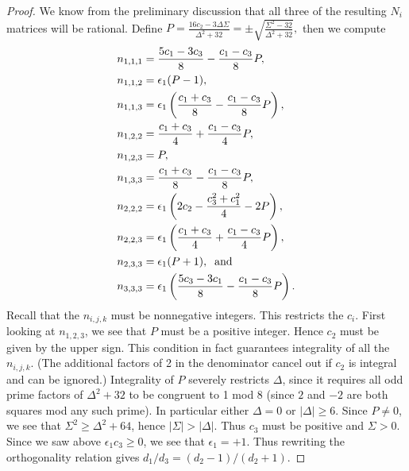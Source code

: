 \documentclass[12pt,psamsfonts]{amsart}
\newcommand{\e}{{\epsilon}}
\numberwithin{equation}{section}
\theoremstyle{definition}
\begin{document}
\begin{proof}
We know from the preliminary discussion that all three of the
resulting $N_i$ matrices will be rational. Define
$P=\frac{16c_2-3\Delta\Sigma}{\Delta^2+32}=
\pm {\sqrt {\frac{\Sigma^2-32}{\Delta^2+32}}},$ then we compute
\begin{equation*}\begin{split}
n_{1,1,1} & =\frac{5c_1-3c_3}{8} - \frac{c_1-c_3}{8} P,\\
n_{1,1,2} & = \e_1 (P-1),\\
n_{1,1,3} & = \e_1 \left(\frac{c_1+c_3}{8}-\frac{c_1-c_3}{8}P\right),\\
n_{1,2,2} & = \frac{c_1+c_3}{4} + \frac{c_1-c_3}{4}P,\\
n_{1,2,3} & = P,\\
n_{1,3,3} & = \frac{c_1+c_3}{8}-\frac{c_1-c_3}{8}P,\\
n_{2,2,2} & = \e_1\left(2c_2-\frac{c_3^2+c_1^2}{4}-2P\right),\\
n_{2,2,3} & = \e_1\left(\frac{c_1+c_3}{4} + \frac{c_1-c_3}{4}P\right),\\
n_{2,3,3} & = \e_1 (P+1),\;\; {\rm and}\\
n_{3,3,3} & = \e_1\left(
\frac{5c_3-3c_1}{8}-\frac{c_1-c_3}{8}P\right).
\end{split}\end{equation*}
Recall that the $n_{i,j,k}$ must be nonnegative integers. This
restricts the $c_i$. First looking at $n_{1,2,3}$, we see that $P$
must be a positive integer. Hence $c_2$ must be given by the upper
sign. This condition in fact guarantees integrality of all the
$n_{i,j,k}$. (The additional factors of 2 in the denominator
cancel out if $c_2$ is integral and can be ignored.) Integrality
of $P$ severely restricts $\Delta$, since it requires all odd
prime factors of $\Delta^2+32$ to be congruent to 1 mod 8 (since
$2$ and $-2$ are both squares mod any such prime). In particular
either $\Delta=0$ or $\vert \Delta\vert \ge 6$. Since $P\ne 0$, we
see that $\Sigma^2\ge \Delta^2+64$, hence $\vert\Sigma\vert >
\vert \Delta\vert$. Thus $c_3$ must be positive and $\Sigma>0$.
Since we saw above $\e_1 c_3\ge 0$, we see that $\e_1=+1$. Thus
rewriting the orthogonality relation gives
$d_1/d_3=(d_2-1)/(d_2+1)$.


\end{proof}
\end{document}
